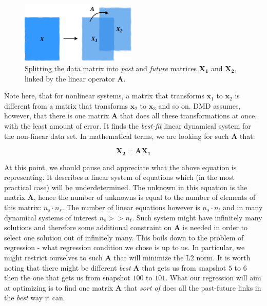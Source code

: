 \documentclass[10pt,twocolumn]{article}
\begin{document}
\begin{figure}[H]
\centering\includegraphics[width=5.5cm]{data-split.png}
\caption{Splitting the data matrix into \textit{past} and \textit{future} matrices $\mathbf{X_1}$ and $\mathbf{X_2}$, linked by the linear operator $\mathbf{A}$.}
\label{fig:linear_system}
\end{figure}

Note here, that for nonlinear systems, a matrix that transforms $\mathbf{x}_1$ to $\mathbf{x}_2$ is different from a matrix that transforms $\mathbf{x}_2$ to $\mathbf{x}_3$ and so on. DMD assumes, however, that there is one matrix $\mathbf{A}$ that does all these transformations at once, with the least amount of error. It finds the \textit{best-fit} linear dynamical system for the non-linear data set. In mathematical terms, we are looking for such $\mathbf{A}$ that:

\begin{equation} \label{eq:linear_dynamics}
\mathbf{X_2} = \mathbf{A} \mathbf{X_1}
\end{equation}

At this point, we should pause and appreciate what the above equation is representing. It describes a linear system of equations which (in the most practical case) will be underdetermined. The unknown in this equation is the matrix $\mathbf{A}$, hence the number of unknowns is equal to the number of elements of this matrix: $n_s \cdot n_s$. The number of linear equations however is $n_s \cdot n_t$ and in many dynamical systems of interest $n_s >> n_t$. Such system might have infinitely many solutions and therefore some additional constraint on $\mathbf{A}$ is needed in order to select one solution out of infinitely many. This boils down to the problem of regression - what regression condition we chose is up to us. In particular, we might restrict ourselves to such $\mathbf{A}$ that will minimize the L2 norm. It is worth noting that there might be different \textit{best} $\mathbf{A}$ that gets us from snapshot $5$ to $6$ then the one that gets us from snapshot $100$ to $101$. What our regression will aim at optimizing is to find one matrix $\mathbf{A}$ that \textit{sort of} does all the past-future links in the \textit{best} way it can.
\end{document}
